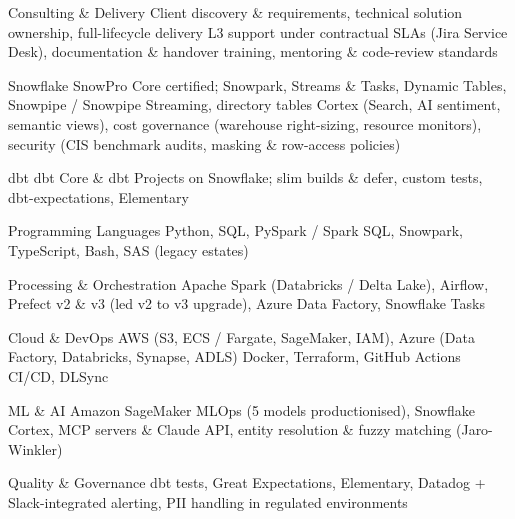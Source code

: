 

\begin{cvskillsnoncentered}

  \cvskill
{Consulting \& Delivery}
{Client discovery \& requirements, technical solution ownership, full-lifecycle delivery}
\cvskill
{}
{L3 support under contractual SLAs (Jira Service Desk), documentation \& handover training, mentoring \& code-review standards}

\cvskill
{Snowflake}
{SnowPro Core certified; Snowpark, Streams \& Tasks, Dynamic Tables, Snowpipe / Snowpipe Streaming, directory tables}
\cvskill
{}
{Cortex (Search, AI sentiment, semantic views), cost governance (warehouse right-sizing, resource monitors), security (CIS benchmark audits, masking \& row-access policies)}

\cvskill
{dbt}
{dbt Core \& dbt Projects on Snowflake; slim builds \& defer, custom tests, dbt-expectations, Elementary}

\cvskill
{Programming Languages}
{Python, SQL, PySpark / Spark SQL, Snowpark, TypeScript, Bash, SAS (legacy estates)}

\cvskill
{Processing \& Orchestration}
{Apache Spark (Databricks / Delta Lake), Airflow, Prefect v2 \& v3 (led v2 to v3 upgrade), Azure Data Factory, Snowflake Tasks}

\cvskill
{Cloud \& DevOps}
{AWS (S3, ECS / Fargate, SageMaker, IAM), Azure (Data Factory, Databricks, Synapse, ADLS)}
\cvskill
{}
{Docker, Terraform, GitHub Actions CI/CD, DLSync}

\cvskill
{ML \& AI}
{Amazon SageMaker MLOps (5 models productionised), Snowflake Cortex, MCP servers \& Claude API, entity resolution \& fuzzy matching (Jaro-Winkler)}

\cvskill
{Quality \& Governance}
{dbt tests, Great Expectations, Elementary, Datadog + Slack-integrated alerting, PII handling in regulated environments}
\end{cvskillsnoncentered}
